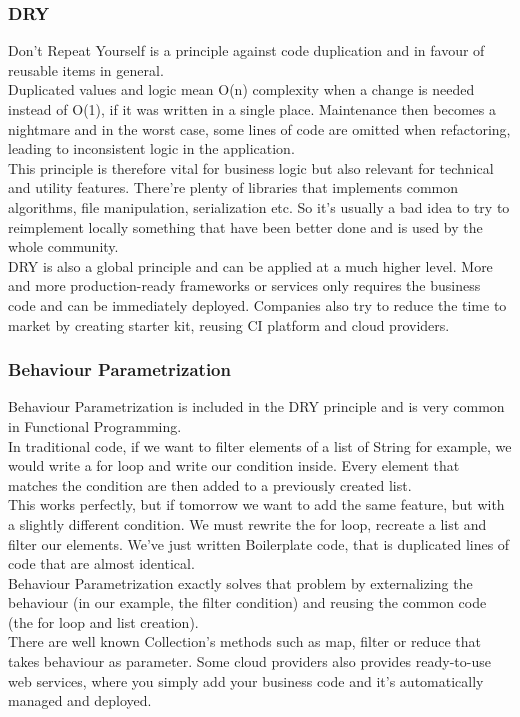 \subsubsection{DRY}
Don't Repeat Yourself is a principle against code duplication and in
favour of reusable items in general. \\
\newline
Duplicated values and logic mean O(n) complexity when a change is needed
instead of O(1), if it was written in a single place.
Maintenance then becomes a nightmare and in the worst case, some lines of
code are omitted when refactoring, leading to inconsistent logic in the
application. \\
\newline
This principle is therefore vital for business logic but also relevant
for technical and utility features.
There're plenty of libraries that implements common algorithms, file
manipulation, serialization etc.
So it's usually a bad idea to try to reimplement locally something that
have been better done and is used by the whole community. \\
\newline
DRY is also a global principle and can be applied at a much higher level.
More and more production-ready frameworks or services only requires
the business code and can be immediately deployed.
Companies also try to reduce the time to market by creating starter kit,
reusing CI platform and cloud providers.

\subsubsection{Behaviour Parametrization}
Behaviour Parametrization is included in the DRY principle and is very
common in Functional Programming. \\
\newline
In traditional code, if we want to filter elements of a list of String
for example, we would write a for loop and write our condition inside.
Every element that matches the condition are then added to a previously
created list. \\
This works perfectly, but if tomorrow we want to add the same feature,
but with a slightly different condition.
We must rewrite the for loop, recreate a list and filter our elements.
We've just written Boilerplate code, that is duplicated lines of code
that are almost identical. \\
\newline
Behaviour Parametrization exactly solves that problem by externalizing
the behaviour (in our example, the filter condition) and reusing the
common code (the for loop and list creation). \\
There are well known Collection's methods such as map, filter or reduce
that takes behaviour as parameter.
Some cloud providers also provides ready-to-use web services,
where you simply add your business code and it's automatically managed
and deployed.

